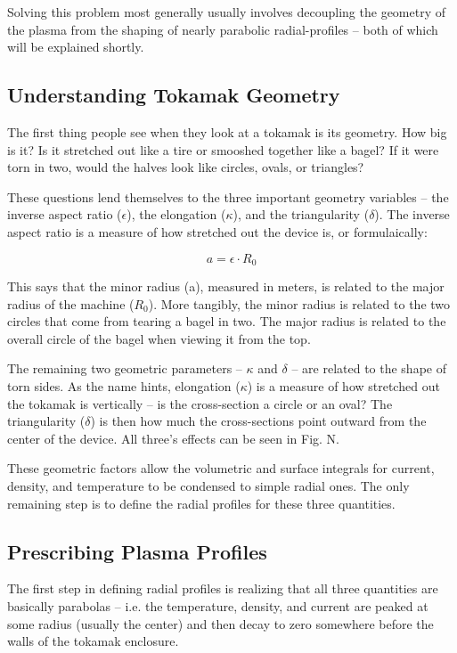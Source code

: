 Solving this problem most generally usually involves decoupling the geometry of the plasma from the shaping of nearly parabolic radial-profiles -- both of which will be explained shortly.

\subsection{Understanding Tokamak Geometry}

The first thing people see when they look at a tokamak is its geometry. How big is it? Is it stretched out like a tire or smooshed together like a bagel? If it were torn in two, would the halves look like circles, ovals, or triangles?

These questions lend themselves to the three important geometry variables -- the inverse aspect ratio ($\epsilon$), the elongation ($\kappa$), and the triangularity ($\delta$). The inverse aspect ratio is a measure of how stretched out the device is, or formulaically:

\begin{equation}
	\label{eq:a}
	a = \epsilon \cdot R_0
\end{equation}

This says that the minor radius (a), measured in meters, is related to the major radius of the machine ($R_0$). More tangibly, the minor radius is related to the two circles that come from tearing a bagel in two. The major radius is related to the overall circle of the bagel when viewing it from the top.

The remaining two geometric parameters -- $\kappa$ and $\delta$ -- are related to the shape of torn sides. As the name hints, elongation ($\kappa$) is a measure of how stretched out the tokamak is vertically -- is the cross-section a circle or an oval? The triangularity ($\delta$) is then how much the cross-sections point outward from the center of the device. All three's effects can be seen in Fig. N.

These geometric factors allow the volumetric and surface integrals for current, density, and temperature to be condensed to simple radial ones. The only remaining step is to define the radial profiles for these three quantities.

\subsection{Prescribing Plasma Profiles}

The first step in defining radial profiles is realizing that all three quantities are basically parabolas -- i.e. the temperature, density, and current are peaked at some radius (usually the center) and then decay to zero somewhere before the walls of the tokamak enclosure.

